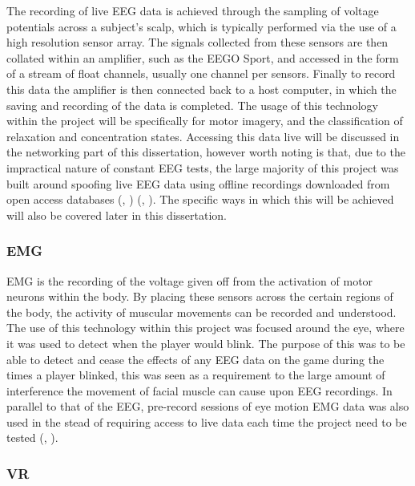 \documentclass[11pt, a4paper]{article}
\newcommand{\ccite}[1]{(\citeauthor{#1}, \citeyear{#1})}
\begin{document}
The recording of live EEG data is achieved through the sampling of voltage potentials across a subject's scalp, which is typically performed via the use of a high resolution sensor array. The signals collected from these sensors are then collated within an amplifier, such as the EEGO Sport, and accessed in the form of a stream of float channels, usually one channel per sensors. Finally to record this data the amplifier is then connected back to a host computer, in which the saving and recording of the data is completed. The usage of this technology within the project will be specifically for motor imagery, and the classification of relaxation and concentration states. Accessing this data live will be discussed in the networking part of this dissertation, however worth noting is that, due to the impractical nature of constant EEG tests, the large majority of this project was built around spoofing live EEG data using offline recordings downloaded from open access databases \ccite{albasri2019eeg} \ccite{goldberger2000physiobank}. The specific ways in which this will be achieved will also be covered later in this dissertation.


\subsubsection{EMG}	

EMG is the recording of the voltage given off from the activation of motor neurons within the body. By placing these sensors across the certain regions of the body, the activity of muscular movements can be recorded and understood. The use of this technology within this project was focused around the eye, where it was used to detect when the player would blink. The purpose of this was to be able to detect and cease the effects of any EEG data on the game during the times a player blinked, this was seen as a requirement to the large amount of interference the movement of facial muscle can cause upon EEG recordings. In parallel to that of the EEG, pre-record sessions of eye motion EMG data was also used in the stead of requiring access to live data each time the project need to be tested \ccite{bhpj-mz94-21}.


\pagebreak

\subsubsection{VR}	
\end{document}
